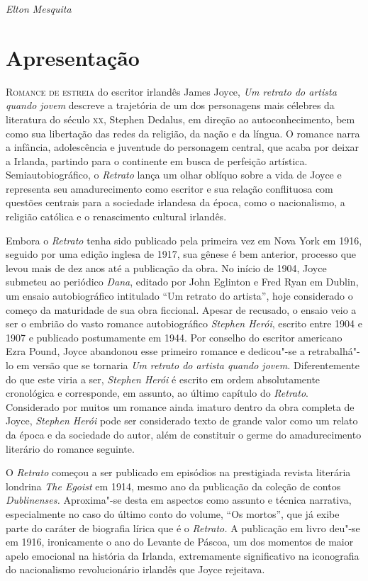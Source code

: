 \hfill\textit{Elton Mesquita}


\chapter[Apresentação, por Beatriz Kopschitz Bastos]{Apresentação}


\textsc{Romance de estreia} do escritor irlandês James Joyce, \textit{Um retrato do artista quando jovem} 
descreve a trajetória de um dos personagens mais célebres
da literatura do século \textsc{xx}, Stephen Dedalus, em direção ao autoconhecimento,
bem como sua libertação das redes da religião, da nação e da língua. O romance
narra a infância, adolescência e juventude do personagem central, que acaba por
deixar a Irlanda, partindo para o continente em busca de perfeição artística.
Semiautobiográfico, o \textit{Retrato} lança um olhar oblíquo sobre a vida de
Joyce e representa seu amadurecimento como escritor e sua relação conflituosa
com questões centrais para a sociedade irlandesa da época, como o nacionalismo,
a religião católica e o renascimento cultural irlandês. 

Embora o \textit{Retrato} tenha sido publicado pela primeira vez em Nova York
em 1916, seguido por uma edição inglesa de 1917, sua gênese é bem anterior,
processo que levou mais de dez anos até a publicação da obra. No início de
1904, Joyce submeteu ao periódico \textit{Dana}, editado por John Eglinton e
Fred Ryan em Dublin, um ensaio autobiográfico intitulado “Um retrato do
artista”, hoje considerado o começo da maturidade de sua obra ficcional.
Apesar de recusado, o ensaio veio a ser o embrião do vasto romance
autobiográfico \textit{Stephen Herói}, escrito entre 1904 e 1907 e publicado
postumamente em 1944. Por conselho do escritor americano Ezra Pound, Joyce
abandonou esse primeiro romance e dedicou"-se a retrabalhá"-lo em versão que se
tornaria \textit{Um} \textit{retrato do artista quando jovem.} Diferentemente
do que este viria a ser, \textit{Stephen Herói} é escrito em ordem
absolutamente cronológica e corresponde, em assunto, ao último capítulo do
\textit{Retrato}. Considerado por muitos um romance ainda imaturo dentro da
obra completa de Joyce, \textit{Stephen Herói} pode ser considerado texto de
grande valor como um relato da época e da sociedade do autor, além de
constituir o germe do amadurecimento literário do romance seguinte. 

O \textit{Retrato} começou a ser publicado em episódios na prestigiada revista
literária londrina \textit{The Egoist} em 1914, mesmo ano da publicação da
coleção de contos \textit{Dublinenses.} Aproxima"-se desta em aspectos como
assunto e técnica narrativa, especialmente no caso do último conto do volume,
“Os mortos”, que já exibe parte do caráter de biografia lírica que é o
\textit{Retrato.} A publicação em livro deu"-se em 1916, ironicamente o
ano do Levante de Páscoa, um dos momentos de maior apelo emocional na história
da Irlanda, extremamente significativo na iconografia do nacionalismo
revolucionário irlandês que Joyce rejeitava.

